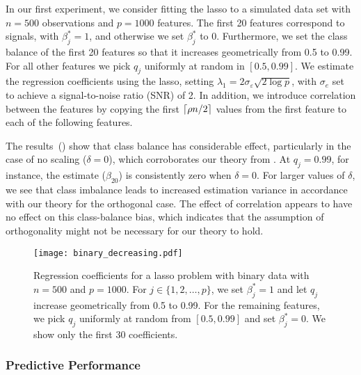 In our first experiment, we consider fitting the lasso to a simulated data set with
\(n=500\) observations and \(p = \num{1000}\) features. The first 20 features correspond to
signals, with \(\beta_j^* = 1\), and otherwise we set \(\beta_j^*\) to 0. Furthermore, we
set the class balance of the first 20 features so that it increases geometrically from 0.5
to 0.99. For all other features we pick \(q_j\) uniformly at random in \([0.5,0.99]\). We
estimate the regression coefficients using the lasso, setting \(\lambda_1 = 2
\sigma_\varepsilon \sqrt{2 \log p }\), with \(\sigma_e\) set to achieve a signal-to-noise
ratio (SNR) of 2. In addition, we introduce correlation between the features by copying the
first \(\lceil \rho n/2 \rceil\) values from the first feature to each of the following features.

The results~() show that class balance has considerable effect,
particularly in the case of no scaling (\(\delta = 0\)), which corroborates our theory from
. At \(q_j=0.99\), for instance, the estimate
(\(\hat{\beta}_{20}\)) is consistently zero when \(\delta = 0\). For larger values of
\(\delta\), we see that class imbalance leads to increased estimation variance in
accordance with our theory for the orthogonal case. The effect of correlation appears to
have no effect on this class-balance bias, which indicates that the assumption of
orthogonality might not be necessary for our theory to hold.

\begin{figure}[htpb]
  \centering
  \texttt{[image: binary\_decreasing.pdf]}
  \caption{%
    Regression coefficients for a lasso problem with binary data with \(n = 500\) and \(p =
    \num{1000}\). For \(j \in \{1,2,\dots,p\}\), we set \(\beta_j^* = 1\) and
    let \(q_j\) increase geometrically from 0.5 to 0.99. For the remaining features,
    we pick \(q_j\) uniformly at random from \([0.5, 0.99]\) and
    set \(\beta_j^* = 0\). We show only the first 30 coefficients.
  }
  \label{fig:binary-decreasing}
\end{figure}

\subsubsection{Predictive Performance}
\label{sec:experiments-predictive-performance}

